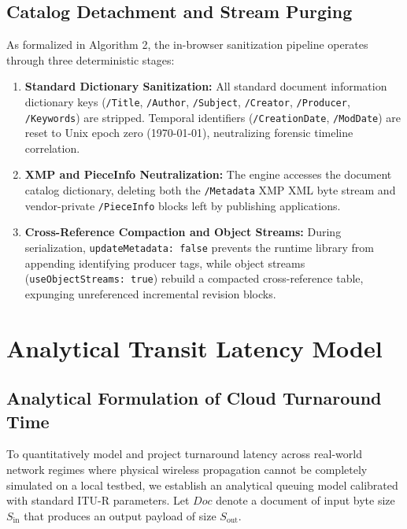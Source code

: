 \documentclass[journal]{IEEEtran}
\begin{document}
\subsection{Catalog Detachment and Stream Purging}
As formalized in Algorithm 2, the in-browser sanitization pipeline operates through three deterministic stages:
\begin{enumerate}[leftmargin=12pt, topsep=2pt, itemsep=1pt]
\item \textbf{Standard Dictionary Sanitization:} All standard document information dictionary keys (\texttt{/Title}, \texttt{/Author}, \texttt{/Subject}, \texttt{/Creator}, \texttt{/Producer}, \texttt{/Keywords}) are stripped. Temporal identifiers (\texttt{/CreationDate}, \texttt{/ModDate}) are reset to Unix epoch zero (1970-01-01), neutralizing forensic timeline correlation.
\item \textbf{XMP and PieceInfo Neutralization:} The engine accesses the document catalog dictionary, deleting both the \texttt{/Metadata} XMP XML byte stream and vendor-private \texttt{/PieceInfo} blocks left by publishing applications.
\item \textbf{Cross-Reference Compaction and Object Streams:} During serialization, \texttt{updateMetadata: false} prevents the runtime library from appending identifying producer tags, while object streams (\texttt{useObjectStreams: true}) rebuild a compacted cross-reference table, expunging unreferenced incremental revision blocks.
\end{enumerate}

\section{Analytical Transit Latency Model}

\subsection{Analytical Formulation of Cloud Turnaround Time}
To quantitatively model and project turnaround latency across real-world network regimes where physical wireless propagation cannot be completely simulated on a local testbed, we establish an analytical queuing model calibrated with standard ITU-R parameters. Let $Doc$ denote a document of input byte size $S_{\text{in}}$ that produces an output payload of size $S_{\text{out}}$.
\end{document}
